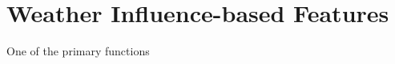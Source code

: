 \section{Weather Influence-based Features}
\label{sec:weatherfeatures}

One of the primary functions